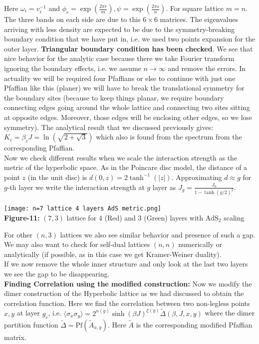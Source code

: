 \documentclass{article}
\begin{document}
	Here $\omega_i=v_i^{-1}$ and $\phi_r=\exp(\frac{2\pi r}{m}) , \psi=\exp(\frac{2 \pi s}{n})$. For square lattice $m=n$. The three bands on each side are due to this $6 \times 6$ matrices. The eigenvalues arriving with less density are expected to be due to the symmetry-breaking boundary condition that we have put in, i.e. we used two points expansion for the outer layer. \textbf{Triangular boundary condition has been checked}. We see that nice behavior for the analytic case because there we take Fourier transform ignoring the boundary effects, i.e. we assume $n \to \infty$ and remove the errors. In actuality we will be required four Pfaffians or else to continue with just one Pfaffian like this (planer) we will have to break the translational symmetry for the boundary sites (because to keep things planar, we require boundary connecting edges going around the whole lattice and connecting two sites sitting at opposite edges. Moreover, those edges will be enclosing other edges, so we lose symmetry). The analytical result that we discussed previously gives: $K_c=\beta_c J=\ln(\sqrt{2+\sqrt{3}})$ which also is found from the spectrum from the corresponding Pfaffian.\\
	
	Now we check different results when we scale the interaction strength as the metric of the hyperbolic space. As in the Poincare disc model, the distance of a point $z$ (in the unit disc) is $d(0,z)=2\tanh^{-1}(|z|)$. Approximating $d \approx g$ for $g$-th layer we write the interaction strength at $g$ layer as $J_g=\frac{J_0}{1-\tanh(g/2)^2}$. 
	
	\begin{center}
		\texttt{[image: n=7 lattice 4 layers AdS metric.png]}\\
		\textbf{Figure-11:} $(7,3)$ lattice for $4$ (Red) and $3$ (Green) layers with $\text{AdS}_2$ scaling\\
	\end{center}
	
	For other $(n,3)$ lattices we also see similar behavior and presence of such a gap. We may also want to check for self-dual lattices $(n,n)$ numerically or analytically (if possible, as in this case we get Kramer-Weiner duality).\\
	
	If we now remove the whole inner structure and only look at the last two layers we see the gap to be disappearing.\\
	
	
	\textbf{Finding Correlation using the modified construction:} Now we modify the dimer construction of the Hyperbolic lattice as we had discussed to obtain the correlation function. Here we find the correlation between two non-legless points $x,y$ at layer $g_c$, i.e. $\langle \sigma_x \sigma_y \rangle=2^{n(g)}\sinh(\beta J)^{\xi(g)}\tilde \Delta(\beta, J, x,y)$ where the dimer partition function $\tilde \Delta=\text{Pf}(\tilde A_{x,y})$. Here $\tilde A$ is the corresponding modified Pfaffian matrix. \\ 
	
\end{document}
